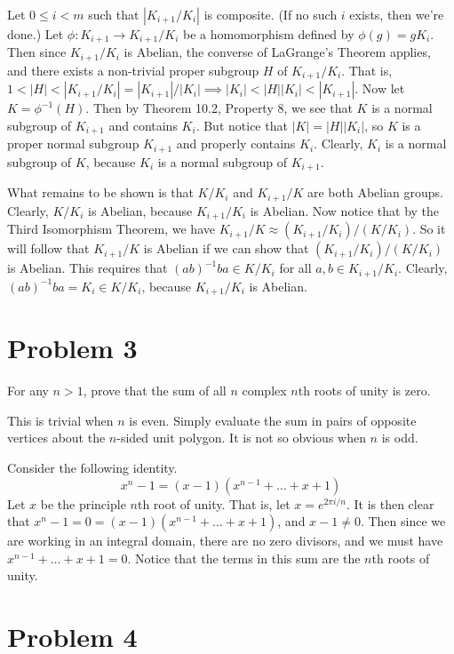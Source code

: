 \documentclass{article}
\begin{document}
Let $0\leq i<m$ such that $|K_{i+1}/K_i|$ is composite.  (If no such $i$ exists,
then we're done.)  Let $\phi:K_{i+1}\to K_{i+1}/K_i$ be a homomorphism defined by
$\phi(g)=gK_i$.  Then since $K_{i+1}/K_i$ is Abelian, the converse of LaGrange's
Theorem applies, and there exists a non-trivial proper subgroup $H$ of $K_{i+1}/K_i$.
That is, $1<|H|<|K_{i+1}/K_i|=|K_{i+1}|/|K_i|\implies |K_i|<|H||K_i|<|K_{i+1}|$.
Now let $K=\phi^{-1}(H)$.
Then by Theorem 10.2, Property 8, we see that $K$ is a normal subgroup
of $K_{i+1}$ and contains $K_i$.  But notice that $|K|=|H||K_i|$, so
$K$ is a proper normal subgroup $K_{i+1}$ and properly contains $K_i$.
Clearly, $K_i$ is a normal subgroup of $K$, because $K_i$ is a normal
subgroup of $K_{i+1}$.

What remains to be shown is that $K/K_i$ and $K_{i+1}/K$ are both Abelian groups.
Clearly, $K/K_i$ is Abelian, because $K_{i+1}/K_i$ is Abelian.  Now notice that
by the Third Isomorphism Theorem, we have $K_{i+1}/K\approx (K_{i+1}/K_i)/(K/K_i)$.
So it will follow that $K_{i+1}/K$ is Abelian if we can show that
$(K_{i+1}/K_i)/(K/K_i)$ is Abelian.  This requires that $(ab)^{-1}ba\in K/K_i$
for all $a,b\in K_{i+1}/K_i$.  Clearly, $(ab)^{-1}ba=K_i\in K/K_i$, because
$K_{i+1}/K_i$ is Abelian.

\pagebreak
\section*{Problem 3}

For any $n>1$, prove that the sum of all $n$ complex $n$th roots of unity is zero.

This is trivial when $n$ is even.  Simply evaluate the sum in pairs of opposite
vertices about the $n$-sided unit polygon.  It is not so obvious when $n$ is odd.

Consider the following identity.
\begin{equation*}
x^n-1=(x-1)(x^{n-1}+\dots+x+1)
\end{equation*}
Let $x$ be the principle $n$th root of unity.  That is, let $x=e^{2\pi i/n}$.
It is then clear that $x^n-1=0=(x-1)(x^{n-1}+\dots+x+1)$, and $x-1\neq 0$.
Then since we are working in an integral domain, there are no zero divisors,
and we must have $x^{n-1}+\dots+x+1=0$.  Notice that the terms in this
sum are the $n$th roots of unity.

\section*{Problem 4}
\end{document}
